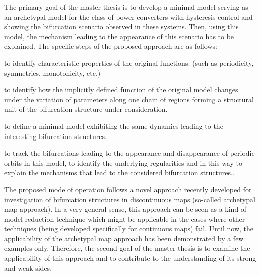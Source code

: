 \documentclass[10pt]{article}
\begin{document}
The primary goal of the master thesis is to develop a minimal model
serving as an archetypal model for the class of power converters with
hysteresis control and showing the bifurcation scenario observed in
these systems.  Then, using this model, the mechanism leading to the
appearance of this scenario has to be explained.  The specific steps
of the proposed approach are as follows:
\begin{compactenum}[1.]
\item to identify characteristic properties of the original functions.
  (such as periodicity, symmetries, monotonicity, etc.)
\item to identify how the implicitly defined function of the original
  model changes under the variation of parameters along one chain of regions
  forming a structural unit of the bifurcation structure under consideration.
\item to define a minimal model exhibiting the same dynamics leading to the
  interesting bifurcation structures.
\item to track the bifurcations leading to the appearance and disappearance
  of periodic orbits in this model, to identify the underlying regularities
  and in this way to
  explain the mechanisms that lead to the considered
  bifurcation structures..
\end{compactenum}

The proposed mode of operation follows a novel approach recently
developed for investigation of bifurcation structures in discontinuous
maps (so-called archetypal map approach).  In a very general sense,
this approach can be seen as a kind of model reduction technique which
might be applicable in the cases where other techniques
(being developed specifically for continuous maps) fail.
Until now, the applicability of the  archetypal map approach
has been demonstrated by a few examples only.
Therefore, the second goal of the master thesis is to  
examine the applicability of this approach and to contribute to
the understanding of its strong and
weak sides.
\end{document}
